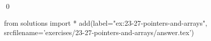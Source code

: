 
\begin{ex}
  \label{ex:23-27-pointers-and-arrays}
  
  \qed
\end{ex}
\begin{python0}
from solutions import *
add(label="ex:23-27-pointers-and-arrays",
    srcfilename='exercises/23-27-pointers-and-arrays/answer.tex')
\end{python0}
